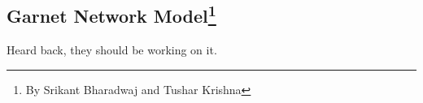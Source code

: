 \subsection[Garnet Network Model]{Garnet Network Model\footnote{By Srikant Bharadwaj and Tushar Krishna}}

Heard back, they should be working on it.

